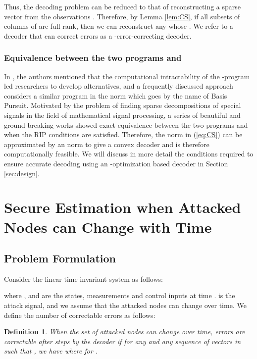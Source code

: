 \documentclass[journal]{IEEEtran}
\newtheorem{Def}{\bf{Definition}}
\begin{document}
Thus, the decoding problem can be reduced to that of reconstructing a sparse vector  from the observations . Therefore, by Lemma \ref{lem:CS}, if all subsets of  columns of  are full rank, then we can reconstruct any  whose  . We refer to a decoder that can correct  errors as a -error-correcting decoder.

\subsubsection{ Equivalence between the two programs  and }\label{sec:equiv}
In \cite{Candes_Tao}, the authors mentioned that the computational intractability of the -program led researchers to develop alternatives, and a frequently discussed approach considers a similar program in the  norm which goes by the name of Basis Pursuit. Motivated by the problem of finding sparse decompositions of special signals in the field of mathematical signal processing, a series of beautiful and ground breaking works \cite{Donoho2003, Elad2002, Gribonval2003, Tropp2004} showed exact equivalence between the two programs  and  when the RIP conditions are satisfied. Therefore, the  norm in (\ref{eq:CS}) can be approximated by an  norm to give a convex decoder and is therefore computationally feasible. 
We will discuss in more detail the conditions required to ensure accurate decoding using an -optimization based decoder in Section \ref{sec:design}. 




\section{Secure Estimation when Attacked Nodes can Change with Time}  \label{sec:main}


\subsection{Problem Formulation}
Consider the linear time invariant system as follows:
 
where ,  and  are the states, measurements and control inputs at time .  is the attack signal, and we assume that the attacked nodes can change over time. We define the number of correctable errors as follows:

\begin{Def}\label{def:num_err_change}
When the set of attacked nodes can change over time,  errors are correctable after  steps by the decoder  if for any  and any sequence of vectors  in  such that , 
we have  where  for .
\end{Def}
\end{document}
